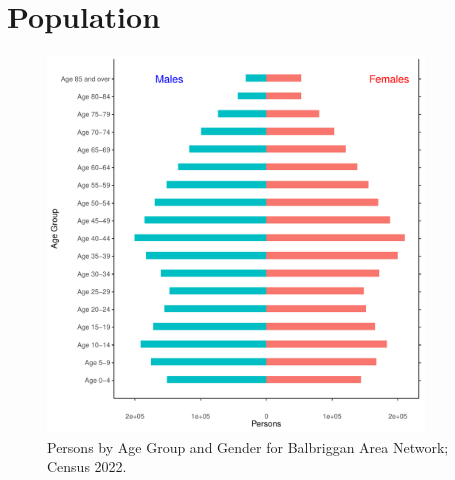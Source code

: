 \documentclass{article}
\begin{document}
\pagebreak

\section{Population} 
\label{sect:Pop}

\begin{figure}[h]
	\centering
	\includegraphics[width = 100mm]{../figures/PyramidPlot.pdf}
	\caption{Persons by Age Group and Gender for Balbriggan Area Network; Census 2022.}
	\label{fig:2ae19629-1a6a-13a3-e055-000000000001}
	\end{figure}
\end{document}
